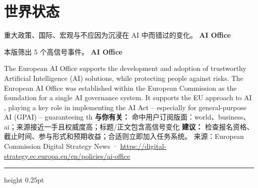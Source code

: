 \documentclass[10.5pt]{ctexart}
\begin{document}
\section*{世界状态}
{\color{ormuted} 重大政策、国际、宏观与不应因为沉浸在 AI 中而错过的变化。}
\vspace{2mm}
{\LARGE\bfseries AI Office}\par
\vspace{1mm}
{\color{ormuted} 本版筛出 5 个高信号事件。}
\vspace{3mm}
{\Large\bfseries AI Office}\par
The European AI Office supports the development and adoption of trustworthy Artificial Intelligence (AI) solutions, while protecting people against risks. The European AI Office was established within the European Commission as the foundation for a single AI governance system. It supports the EU approach to AI , playing a key role in implementing the AI Act – especially for general-purpose AI (GPAI) – guaranteeing th
\textbf{与你有关：} 命中用户订阅版面：world、business、ai；来源接近一手且权威度高；标题/正文包含高信号变化
\textbf{建议：} 检查报名资格、截止时间、参与形式和预期收益；合适则立即加入任务系统。
{\footnotesize\color{ormuted} 来源：European Commission Digital Strategy News · \url{https://digital-strategy.ec.europa.eu/en/policies/ai-office}}
\vspace{4mm}
\hrule height 0.25pt
\vspace{3mm}
\end{document}
